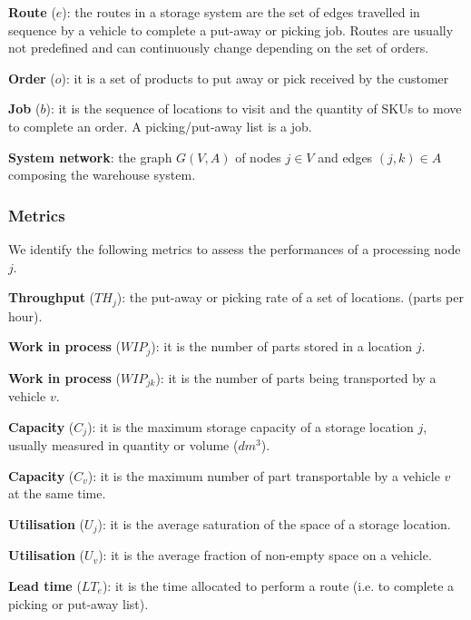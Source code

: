 \textbf{Route} ($e$): the routes in a storage system are the set of edges travelled in sequence by a vehicle to complete a put-away or picking job. Routes are usually not predefined and can continuously change depending on the set of orders. \par

\textbf{Order} ($o$): it is a set of products to put away or pick received by the customer \par

\textbf{Job} ($b$): it is the sequence of locations to visit and the quantity of SKUs to move to complete an order. A picking/put-away list is a job. \par

\textbf{System network}: the graph $G(V,A)$ of nodes $j\in V$ and edges $\left(j,k\right)\in A$ composing the warehouse system.

\subsubsection{Metrics}
We identify the following metrics to assess the performances of a processing node $j$.\par

\textbf{Throughput} ($TH_{j}$): the put-away or picking rate of a set of locations. (parts per hour).\par

\textbf{Work in process} ($WIP_{j}$): it is the number of parts stored in a location $j$.\par

\textbf{Work in process} ($WIP_{jk}$): it is the number of parts being transported by a vehicle $v$. \par

\textbf{Capacity} ($C_j$): it is the maximum storage capacity of a storage location $j$, usually measured in quantity or volume ($dm^3$).\par

\textbf{Capacity} ($C_v$): it is the maximum number of part transportable by a vehicle $v$ at the same time. \par

\textbf{Utilisation} ($U_j$): it is the average saturation of the space of a storage location. \par

\textbf{Utilisation} ($U_v$): it is the average fraction of non-empty space on a vehicle. \par

\textbf{Lead time} ($LT_e$): it is the time allocated to perform a route (i.e. to complete a picking or put-away list). \par

